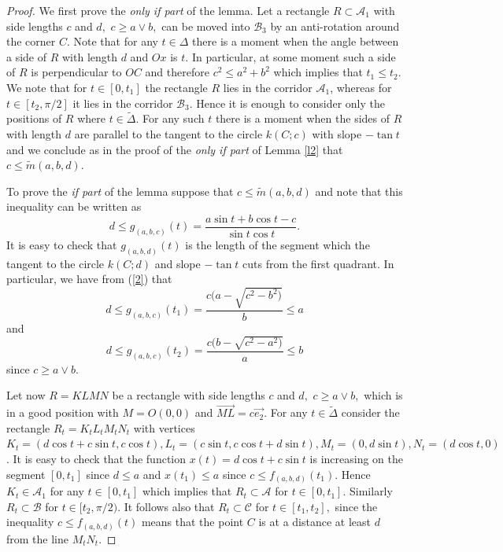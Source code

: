 \documentclass[12pt]{amsart}
\def\A{\mathcal A}
\def\B{\mathcal B}
\def\C{\mathcal C}
\def\DD{\Delta}
\def\ss{\subset}
\begin{document}
\begin{proof}
We first prove the \emph{only if part} of the lemma. Let a
rectangle $R\ss \A_1$ with side lengths $c$ and $d,$ $c\ge a\vee
b,$ can be moved into $\B_3$ by an anti-rotation around the corner
$C$. Note that for any $t\in \DD$ there is a moment when the angle
between a side of $R$ with length $d$ and $Ox$ is $t$. In
particular, at some moment such a side of $R$ is perpendicular to
$OC$ and therefore $c^2\le a^2+b^2$ which implies that $t_1\le
t_2$. We note that for $t\in [0,t_1]$ the rectangle $R$ lies in
the corridor $\A_1$, whereas for $t\in [t_2,\pi/2]$ it lies in the
corridor $\B_3$. Hence it is enough to consider only the positions
of $R$ where $t\in \widetilde{\DD}$. For any such $t$ there is a
moment when the sides of $R$ with length $d$ are parallel to the
tangent to the circle $k(C;c)$ with slope $-\tan t$ and we
conclude as in the proof of the \emph{only if part} of Lemma
\ref{l2} that $c\le \widetilde{m}(a,b,d)$.

To prove the \emph{if part } of the lemma suppose that $c\le
\widetilde{m}(a,b,d)$ and note that this inequality can be written
as
\begin{equation}\label{2}
d\le g_{(a,b,c)}(t)=\frac{a\sin t+b\cos t-c}{\sin t\cos t} .
\end{equation}
It is easy to check that $g_{(a,b,d)}(t)$ is the length of the
segment which the tangent to the circle $k(C;d)$ and slope $-\tan
t$ cuts from the first quadrant. In particular, we have from
(\ref{2}) that
$$ d\le g_{(a,b,c)}(t_1)=\frac{c(a-\sqrt{c^2-b^2)}}{b}\leq a $$
and
$$ d\le g_{(a,b,c)}(t_2)=\frac{c(b-\sqrt{c^2-a^2)}}{a}\leq b $$
since $c\ge a\vee b .$

Let now $R=KLMN$ be a rectangle with side lengths $c$ and $d,$
$c\ge a\vee b,$ which is in a good position with $M=O(0,0)$ and
$\overrightarrow{ML} = c\overrightarrow{e_2} $. For any $t\in
\widetilde{\DD}$ consider the rectangle $R_t=K_tL_tM_tN_t$ with
vertices $K_t=(d\cos t+c\sin t, c\cos t) , L_t=(c\sin t, c\cos
t+d\sin t) , M_t=(0,d\sin t) , N_t=(d\cos t,0) $. It is easy to
check that the function $x(t)=d\cos t+c\sin t$ is increasing on
the segment $[0,t_1]$ since $d\le a$ and $x(t_1)\le a $ since
$c\le f_{(a,b,d)}(t_1)$. Hence $K_t\in \A_1$ for any $t\in
[0,t_1]$ which implies that $R_t \ss \A$ for $t\in [0,t_1]$.
Similarly $R_t \ss \B$ for $t\in [t_2, \pi/2)$. It follows also
that $R_t \ss \C$ for $t\in [t_1,t_2],$ since the inequality $c\le
f_{(a,b,d)}(t) $ means that the point $C$ is at a distance at
least $d$ from the line $M_tN_t$.
\end{proof}
\end{document}
